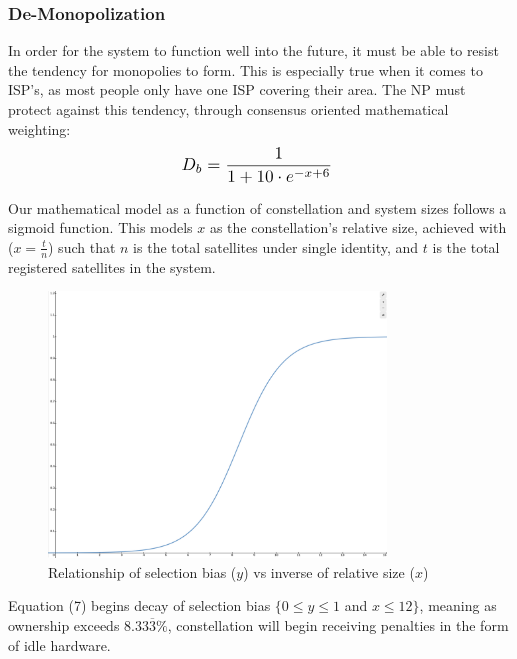 \documentclass[11pt]{article}
\begin{document}
\subsubsection{De-Monopolization}
\label{no-monopolies}

In order for the system to function well into the future, it must be able to resist the tendency for monopolies to form.
This is especially true when it comes to ISP's, as most people only have one ISP covering their area.
The NP must protect against this tendency, through consensus oriented mathematical weighting: \\

\begin{equation}
\resizebox{.33\hsize}{!}{$D_b = \mathlarger{\frac{1}{1 + 10\cdot e^{-x + 6}}}$ }
\end{equation}

\bigskip
\noindent Our mathematical model as a function of constellation and system sizes follows a sigmoid function.
This models $x$ as the constellation's relative size, achieved with ($x = \frac{t}{n}$) such that $n$ is the total satellites under single identity, and $t$ is the total registered satellites in the system.

\pagebreak
\begin{figure}[h]
    \centering
    \includegraphics[width=0.8\textwidth]{./images/rsz_sigmoid.png}
    \caption{Relationship of selection bias ($y$) vs inverse of relative size ($x$)}
\end{figure}

\noindent Equation (7) begins decay of selection bias $\{0 \leq y \leq 1$ and $x \leq 12\}$, meaning as ownership exceeds $8.33\overline{3} \%$, constellation will begin receiving penalties in the form of idle hardware.
\end{document}
